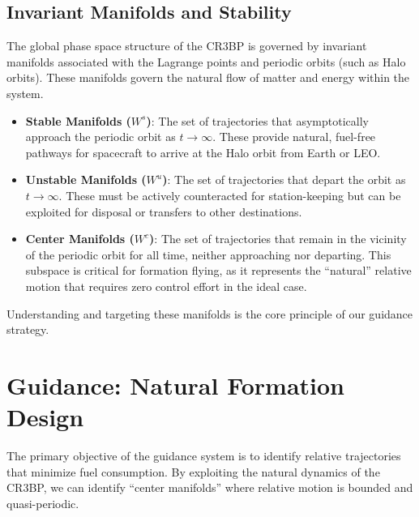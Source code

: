 \documentclass[10pt,letterpaper]{article}
\begin{document}
\subsection{Invariant Manifolds and Stability}
The global phase space structure of the CR3BP is governed by invariant manifolds associated with the Lagrange points and periodic orbits (such as Halo orbits). These manifolds govern the natural flow of matter and energy within the system.
\begin{itemize}
    \item \textbf{Stable Manifolds ($W^s$)}: The set of trajectories that asymptotically approach the periodic orbit as $t \to \infty$. These provide natural, fuel-free pathways for spacecraft to arrive at the Halo orbit from Earth or LEO.
    \item \textbf{Unstable Manifolds ($W^u$)}: The set of trajectories that depart the orbit as $t \to \infty$. These must be actively counteracted for station-keeping but can be exploited for disposal or transfers to other destinations.
    \item \textbf{Center Manifolds ($W^c$)}: The set of trajectories that remain in the vicinity of the periodic orbit for all time, neither approaching nor departing. This subspace is critical for formation flying, as it represents the ``natural'' relative motion that requires zero control effort in the ideal case.
\end{itemize}
Understanding and targeting these manifolds is the core principle of our guidance strategy.

\section{Guidance: Natural Formation Design}

The primary objective of the guidance system is to identify relative trajectories that minimize fuel consumption. By exploiting the natural dynamics of the CR3BP, we can identify ``center manifolds'' where relative motion is bounded and quasi-periodic.
\end{document}
